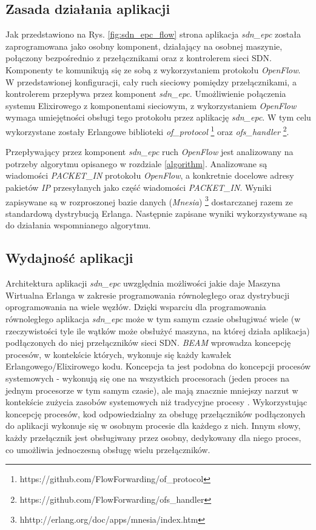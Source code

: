 \subsection{Zasada działania aplikacji}

Jak przedstawiono na Rys. \ref{fig:sdn_epc_flow} strona
\pageref{fig:sdn_epc_flow} aplikacja \textit{sdn\_epc} została zaprogramowana
jako osobny komponent, działający na osobnej maszynie, połączony bezpośrednio z
przełącznikami oraz z kontrolerem sieci SDN. Komponenty te komunikują się ze
sobą z wykorzystaniem protokołu \textit{OpenFlow}. W przedstawionej konfiguracji,
cały ruch sieciowy pomiędzy przełącznikami, a kontrolerem przepływa przez
komponent \textit{sdn\_epc}. Umożliwienie połączenia systemu Elixirowego z
komponentami sieciowym, z wykorzystaniem \textit{OpenFlow} wymaga umiejętności
obsługi tego protokołu przez aplikację \textit{sdn\_epc}. W tym celu
wykorzystane zostały Erlangowe biblioteki \textit{of\_protocol}
\footnote{https://github.com/FlowForwarding/of\_protocol} oraz
\textit{ofs\_handler} \footnote{https://github.com/FlowForwarding/ofs\_handler}.

Przepływający przez komponent \textit{sdn\_epc} ruch \textit{OpenFlow} jest
analizowany na potrzeby algorytmu opisanego w rozdziale \ref{algorithm}.
Analizowane są wiadomości \textit{PACKET\_IN} protokołu \textit{OpenFlow}, a
konkretnie docelowe adresy pakietów \textit{IP} przesyłanych jako część
wiadomości \textit{PACKET\_IN}. Wyniki zapisywane są w rozproszonej bazie danych
(\textit{Mnesia}) \footnote{hhttp://erlang.org/doc/apps/mnesia/index.htm}
dostarczanej razem ze standardową dystrybucją Erlanga. Następnie zapisane
wyniki wykorzystywane są do działania wspomnianego algorytmu.

\subsection{Wydajność aplikacji}

Architektura aplikacji \textit{sdn\_epc} uwzględnia możliwości jakie daje
Maszyna Wirtualna Erlanga w zakresie programowania równoległego oraz dystrybucji
oprogramowania na wiele węzłów. Dzięki wsparciu dla programowania równoległego
aplikacja \textit{sdn\_epc} może w tym samym czasie obsługiwać wiele (w
rzeczywistości tyle ile wątków może obsłużyć maszyna, na której działa
aplikacja) podłączonych do niej przełączników sieci SDN. \textit{BEAM} wprowadza
koncepcję procesów, w kontekście których, wykonuje się każdy kawałek
Erlangowego/Elixirowego kodu. Koncepcja ta jest podobna do koncepcji procesów
systemowych - wykonują się one na wszystkich procesorach (jeden proces na
jednym procesorze w tym samym czasie), ale mają znacznie mniejszy narzut w
kontekście zużycia zasobów systemowych niż tradycyjne procesy \cite{progelixir}.
Wykorzystując koncepcję procesów, kod odpowiedzialny za obsługę przełączników
podłączonych do aplikacji wykonuje się w osobnym procesie dla każdego z nich.
Innym słowy, każdy przełącznik jest obsługiwany przez osobny, dedykowany dla
niego proces, co umożliwia jednoczesną obsługę wielu przełączników.

